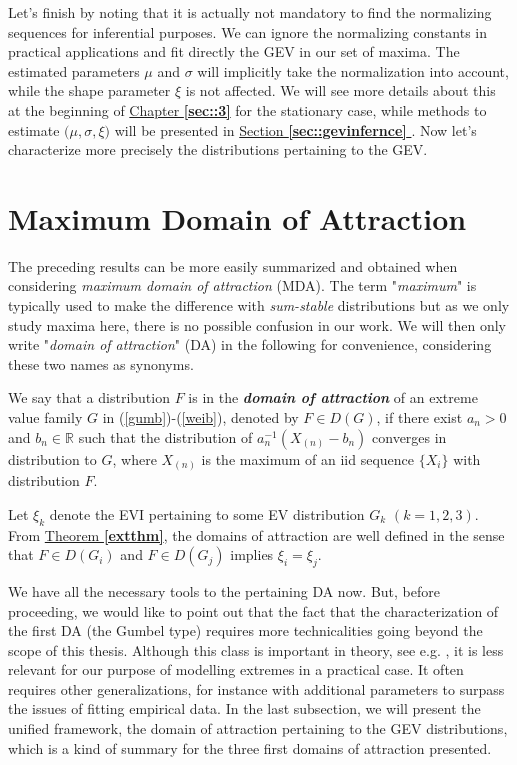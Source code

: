 Let's finish by noting that it is actually not mandatory to find the normalizing sequences for inferential purposes.
We can ignore the normalizing constants in practical applications and fit directly the GEV in our set of maxima.
The estimated parameters $\mu$ and $\sigma$ will implicitly take the normalization into account, while the shape parameter $\xi$ is not affected. We will see more details about this at the beginning of \hyperref[sec::3]{Chapter \textbf{\ref{sec::3}}} for the stationary case, while methods to estimate $\big( \mu, \sigma,\xi\big)$ will be presented in \hyperref[sec::gevinfernce]{ Section \textbf{\ref{sec::gevinfernce}} } . Now let's characterize more precisely the distributions pertaining to the GEV.

\section{Maximum Domain of Attraction}\label{sec:mda}

The preceding results can be more easily summarized and obtained when considering \emph{maximum domain of attraction} (MDA). The term "\emph{maximum}" is typically used to make the difference with \emph{sum-stable} distributions but as we only study maxima here, there is no possible confusion in our work. We will then only write "\emph{domain of attraction}" (DA) in the following for convenience, considering these two names as synonyms.

\begin{definition} We say that a distribution $F$ is in the \emph{\textbf{domain of attraction}} of an extreme value family $G$ in (\ref{gumb})-(\ref{weib}), denoted by $F\in D(G)$, if there exist $a_n>0$ and $b_n\in\mathbb{R}$ such that the distribution of $a_n^{-1}(X_{(n)}-b_n)$ converges in distribution to $G$, where $X_{(n)}$ is the maximum of an iid sequence $\{X_i\}$ with distribution $F$. %
\end{definition}
Let $\xi_k$ denote the EVI pertaining to some EV distribution $G_k$ $(k=1,2,3)$. From \hyperref[extthm]{Theorem \textbf{\ref{extthm}}}, the domains of attraction are well defined in the sense that $F\in D(G_i)$ and $F\in D(G_j)$ implies $\xi_i=\xi_j$.


We have all the necessary tools to  the pertaining DA now. But, before proceeding, we would like to point out that the fact that the characterization of the first DA (the Gumbel type) requires more technicalities going beyond the scope of this thesis. Although this class is important in theory, see e.g. \cite{pinheiro_comparative_2015}, it is less relevant for our purpose of modelling extremes in a practical case. It often requires other generalizations, for instance with additional parameters to surpass the issues of fitting empirical data. In the last subsection, we will present the unified framework, the domain of attraction pertaining to the GEV distributions, which is a kind of summary for the three first domains of attraction presented.


